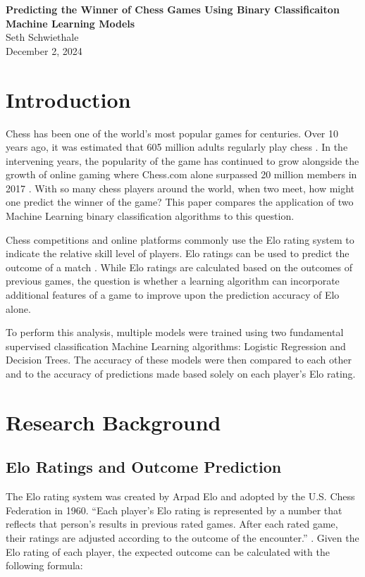 \documentclass[12pt]{article}
\begin{document}
\begin{titlepage}
    \centering
    \vspace*{2in}
    {\Huge \bfseries Predicting the Winner of Chess Games Using Binary Classificaiton Machine Learning Models \\[2in]}
    {\Large Seth Schwiethale \\[0.5in]}
    {\Large December 2, 2024 \\}
    \vfill
\end{titlepage}

\newpage
\tableofcontents
\newpage

\section{Introduction}
Chess has been one of the world's most popular games for centuries. Over 10 years ago, it was estimated that 605 million adults regularly play chess \cite{fidePressRelease2012}. In the intervening years, the popularity of the game has continued to grow alongside the growth of online gaming where Chess.com alone surpassed 20 million members in 2017 \cite{chessMembers}. With so many chess players around the world, when two meet, how might one predict the winner of the game? This paper compares the application of two Machine Learning binary classification algorithms to this question.

Chess competitions and online platforms commonly use the Elo rating system to indicate the relative skill level of players. Elo ratings can be used to predict the outcome of a match \cite{chessElo}. While Elo ratings are calculated based on the outcomes of previous games, the question is whether a learning algorithm can incorporate additional features of a game to improve upon the prediction accuracy of Elo alone.

To perform this analysis, multiple models were trained using two fundamental supervised classification Machine Learning algorithms: Logistic Regression and Decision Trees. The accuracy of these models were then compared to each other and to the accuracy of predictions made based solely on each player's Elo rating.

\section{Research Background}

\subsection{Elo Ratings and Outcome Prediction}
The Elo rating system was created by Arpad Elo and adopted by the U.S. Chess Federation in 1960. ``Each player's Elo rating is represented by a number that reflects that person's results in previous rated games. After each rated game, their ratings are adjusted according to the outcome of the encounter.'' \cite{chessElo}. Given the Elo rating of each player, the expected outcome can be calculated with the following formula:
\end{document}
